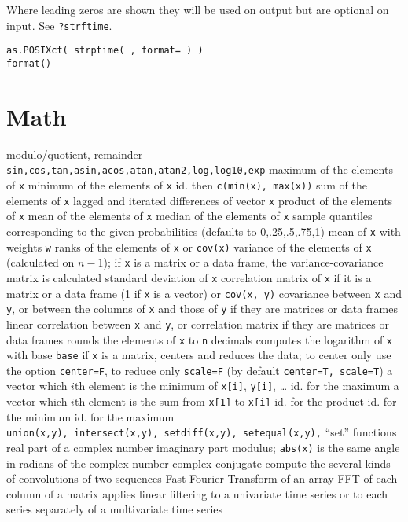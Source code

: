 Where leading zeros are shown they will be used on output but are
optional on input. See {\tt ?strftime}.

{\tt as.POSIXct( strptime( , format= ) )\\
    format()}

\section{Math}{}

\cmdL{\%\%, \%/\%}	{modulo/quotient, remainder}
{\tt sin,cos,tan,asin,acos,atan,atan2,log,log10,exp}
	{ maximum of the elements of {\tt x}}
	{ minimum of the elements of {\tt x}}
	{ id. then {\tt c(min(x), max(x))}}
	{ sum of the elements of {\tt x}}
	{ lagged and iterated differences of vector {\tt x}}
	{ product of the elements of {\tt x}}
	{ mean of the elements of {\tt x}}
	{ median of the elements of {\tt x}}
	{sample quantiles corresponding to the given probabilities (defaults to 0,.25,.5,.75,1)}
	{mean of {\tt x} with weights {\tt w}}
	{ ranks of the elements of {\tt x}}
	{or {\tt cov(x)}  variance of the elements of {\tt x}
    (calculated on $n-1$); if {\tt x} is a matrix or a data frame, the
    variance-covariance matrix is calculated}
	{standard deviation of {\tt x}}
	{correlation matrix of {\tt x} if it is a matrix or a data frame (1 if {\tt x} is a vector)}
	{or {\tt cov(x, y)}  covariance between {\tt x} and {\tt y}, or between the columns of {\tt x} and those of {\tt y} if they are matrices or data frames}
	{linear correlation between {\tt x} and {\tt y}, or correlation matrix if they are matrices or data frames}
	{rounds the elements of {\tt x} to {\tt n} decimals}
	{computes the logarithm of {\tt x} with base {\tt base}}
	{if {\tt x} is a matrix, centers and reduces the data; to
center only use the option {\tt center=F}, to reduce only {\tt scale=F}
(by default {\tt center=T, scale=T})}
	{ a vector which $i$th element is the minimum of {\tt x[i]}, {\tt y[i]}, \ldots}
	{ id. for the maximum}
	{a vector which $i$th element is the sum from {\tt x[1]} to {\tt x[i]}}
	{ id. for the product}
	{ id. for the minimum}
	{ id. for the maximum}
{\tt{union(x,y)},~{\tt intersect(x,y)},~{\tt setdiff(x,y)},~{\tt setequal(x,y)},}
	{``set'' functions}
	{real part of a complex number}
	{imaginary part}
	{modulus; {\tt abs(x)} is the same}
	{angle in radians of the complex number}
	{complex conjugate}
	{compute the several kinds of convolutions of two sequences}
	{Fast Fourier Transform of an array}
	{FFT of each column of a matrix}
	{applies linear filtering to a univariate time series or to each series separately of a multivariate time series}


